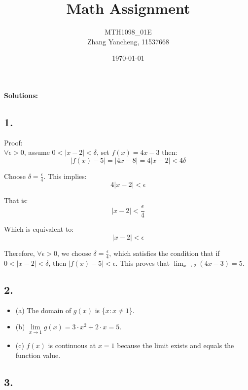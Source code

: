 \documentclass[a4paper, 7pt]{article}
\title{Math Assignment}
\author{MTH1098\_01E\\ Zhang Yancheng, 11537668}
\date{\today}
\begin{document}
\maketitle

\noindent\textbf{Solutions:}

\subsection*{1.}
Proof: \\
$\forall \epsilon > 0$, assume $0 < |x - 2| < \delta$, set $f(x) = 4x - 3$ then:
\[
| f(x) - 5| = |4x - 8| = 4|x - 2| < 4\delta
\]

Choose $\delta = \frac{\epsilon}{4}$. This implies:
\[
4|x - 2| < \epsilon
\]

That is:
\[
|x - 2| < \frac{\epsilon}{4}
\]

Which is equivalent to:
\[
|x - 2| < \epsilon
\]

Therefore, $\forall \epsilon > 0$, we choose $\delta = \frac{\epsilon}{4}$, which satisfies the condition that if $0 < |x - 2| < \delta$, then $|f(x) - 5| < \epsilon$. This proves that $\lim_{x \to 2} (4x-3) = 5$.

\subsection*{2.}

\begin{itemize}
    \item (a) The domain of $g(x)$ is  \{$x: x \neq 1$\}.
    \item (b) $\lim\limits_{x \to 1} g(x) = 3\cdot x^2 + 2\cdot x = 5$.
    \item (c) $f(x)$ is continuous at $x = 1$ because the limit exists and equals the function value.
\end{itemize}

\subsection*{3.}
\end{document}
